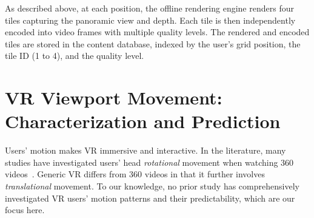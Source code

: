 As described above, at each position, the offline rendering engine renders four tiles capturing the panoramic view and depth. Each tile is then independently encoded into video frames with multiple quality levels.
%
The rendered and encoded tiles are stored in the content database, indexed by the user's grid position, the tile ID (1 to 4), and the quality level.


\section{VR Viewport Movement: Characterization and Prediction}
\label{sec:motion_prediction}

Users' motion makes VR immersive and interactive. In the literature, many studies have investigated users' head \emph{rotational} movement when watching 360\degree{} videos~\cite{fan2017fixation,hou2018predictive,bao2016shooting}. Generic VR differs from 360\degree{} videos in that it further involves \emph{translational} movement.
%
To our knowledge, no prior study has comprehensively investigated VR users' motion patterns and their predictability, which are our focus here.

